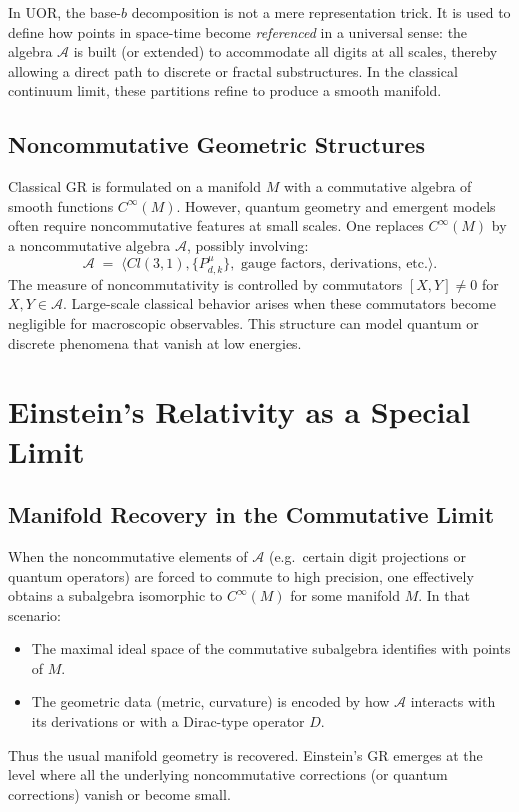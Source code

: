 \documentclass[11pt]{article}
\begin{document}
In UOR, the base-$b$ decomposition is not a mere representation trick. It is used to define how points in space-time become \emph{referenced} in a universal sense: the algebra $\mathcal{A}$ is built (or extended) to accommodate all digits at all scales, thereby allowing a direct path to discrete or fractal substructures. In the classical continuum limit, these partitions refine to produce a smooth manifold.

\subsection{Noncommutative Geometric Structures}
Classical GR is formulated on a manifold $M$ with a commutative algebra of smooth functions $C^\infty(M)$. However, quantum geometry and emergent models often require noncommutative features at small scales. One replaces $C^\infty(M)$ by a noncommutative algebra $\mathcal{A}$, possibly involving:
\[
\mathcal{A}\;=\;
\bigl\langle Cl(3,1), \{P_{d,k}^\mu\}, \text{ gauge factors, derivations, etc.}\bigr\rangle.
\]
The measure of noncommutativity is controlled by commutators $[X,Y] \neq 0$ for $X,Y \in \mathcal{A}$. Large-scale classical behavior arises when these commutators become negligible for macroscopic observables. This structure can model quantum or discrete phenomena that vanish at low energies.

\section{Einstein's Relativity as a Special Limit}
\label{sec:Einstein-limit}

\subsection{Manifold Recovery in the Commutative Limit}
When the noncommutative elements of $\mathcal{A}$ (e.g.\ certain digit projections or quantum operators) are forced to commute to high precision, one effectively obtains a subalgebra isomorphic to $C^\infty(M)$ for some manifold $M$. In that scenario:
\begin{itemize}
\item The maximal ideal space of the commutative subalgebra identifies with points of $M$.
\item The geometric data (metric, curvature) is encoded by how $\mathcal{A}$ interacts with its derivations or with a Dirac-type operator $D$. 
\end{itemize}
Thus the usual manifold geometry is recovered. Einstein's GR emerges at the level where all the underlying noncommutative corrections (or quantum corrections) vanish or become small.
\end{document}
